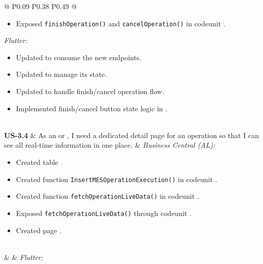 \begin{longtable}{@{} P{0.09\linewidth} P{0.38\linewidth} P{0.49\linewidth} @{}}
\begin{itemize}[noitemsep, topsep=0pt, partopsep=0pt, leftmargin=*]
\begin{itemize}[noitemsep, topsep=0pt, partopsep=0pt, leftmargin=*]
			\item \texttt{TryCloseOperation()} in codeunit .
			\item \texttt{InsertOperationStatus()} and \texttt{InsertIdleMachineStatus()} in codeunit .
			\item \texttt{finishOperation()} and \texttt{cancelOperation()} in codeunit . 
		\end{itemize}
		\item Exposed \texttt{finishOperation()} and \texttt{cancelOperation()} in codeunit .
	\end{itemize}

	\noindent\textit{Flutter:}
	\begin{itemize}[noitemsep, topsep=0pt, partopsep=0pt, leftmargin=*]
		\item Updated  to consume the new endpoints.
		\item Updated  to manage its state.
		\item Updated  to handle finish/cancel operation flow.
		\item Implemented finish/cancel button state logic in .
	\end{itemize} \\
	\midrule
	\textbf{US-3.4}
	& As an  or , I need a dedicated
	detail page for an operation so that I can see all real-time information
	in one place.
	& \noindent\textit{Business Central (AL):}
	\begin{itemize}[noitemsep, topsep=0pt, partopsep=0pt, leftmargin=*]
		\item Created table .
		\item Created function \texttt{InsertMESOperationExecution()} in codeunit .
		\item Created function \texttt{fetchOperationLiveData()} in codeunit .
		\item Exposed \texttt{fetchOperationLiveData()} through codeunit .
		\item Created page .
	\end{itemize}
\\ & &
	\noindent\textit{Flutter:}
	\begin{itemize}[noitemsep, topsep=0pt, partopsep=0pt, leftmargin=*]

\end{itemize}
\end{longtable}
